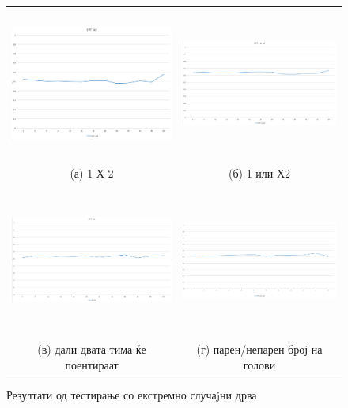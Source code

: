 \begin{figure}[H]
\centering
\begin{tabular}{cc}
  \includegraphics[width=8cm,height=5cm]{images/ert_1x2.png} &   
  \includegraphics[width=8cm,height=5cm]{images/ert_1_or_x2.png} \\
(а) 1 Х 2 & (б) 1 или Х2 \\
 \includegraphics[width=8cm,height=5cm]{images/ert_bts.png}
 &   
 \includegraphics[width=8cm,height=5cm]{images/ert_odd_even.png} \\
(в) дали двата тима ќе поентираат & (г) парен/непарен број на голови \\
\end{tabular}
\caption{Резултати од тестирање со екстремно случаjни дрва}
\label{fig:ert}
\end{figure}


